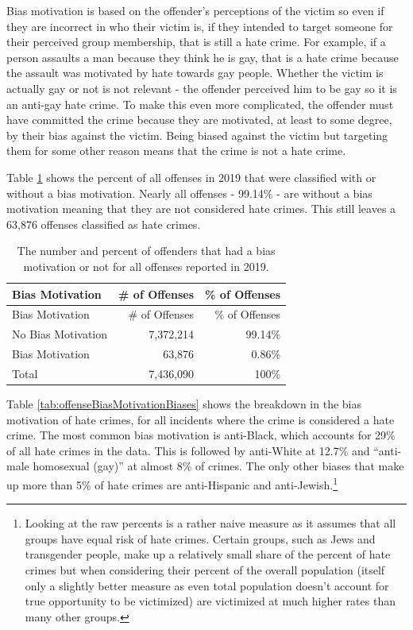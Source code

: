 \documentclass[
  12pt,
  openany]{book}
\begin{document}
Bias motivation is based on the offender's perceptions of the victim so even if they are incorrect in who their victim is, if they intended to target someone for their perceived group membership, that is still a hate crime. For example, if a person assaults a man because they think he is gay, that is a hate crime because the assault was motivated by hate towards gay people. Whether the victim is actually gay or not is not relevant - the offender perceived him to be gay so it is an anti-gay hate crime. To make this even more complicated, the offender must have committed the crime because they are motivated, at least to some degree, by their bias against the victim. Being biased against the victim but targeting them for some other reason means that the crime is not a hate crime.

Table \ref{tab:offenseBiasMotivation} shows the percent of all offenses in 2019 that were classified with or without a bias motivation. Nearly all offenses - 99.14\% - are without a bias motivation meaning that they are not considered hate crimes. This still leaves a 63,876 offenses classified as hate crimes.

\begin{longtable}[]{@{}lrr@{}}
\caption{\label{tab:offenseBiasMotivation}The number and percent of offenders that had a bias motivation or not for all offenses reported in 2019.}\tabularnewline
\toprule
Bias Motivation & \# of Offenses & \% of Offenses\tabularnewline
\midrule
\endfirsthead
\toprule
Bias Motivation & \# of Offenses & \% of Offenses\tabularnewline
\midrule
\endhead
No Bias Motivation & 7,372,214 & 99.14\%\tabularnewline
Bias Motivation & 63,876 & 0.86\%\tabularnewline
Total & 7,436,090 & 100\%\tabularnewline
\bottomrule
\end{longtable}

Table \ref{tab:offenseBiasMotivationBiases} shows the breakdown in the bias motivation of hate crimes, for all incidents where the crime is considered a hate crime. The most common bias motivation is anti-Black, which accounts for 29\% of all hate crimes in the data. This is followed by anti-White at 12.7\% and ``anti-male homosexual (gay)'' at almost 8\% of crimes. The only other biases that make up more than 5\% of hate crimes are anti-Hispanic and anti-Jewish.\footnote{Looking at the raw percents is a rather naive measure as it assumes that all groups have equal risk of hate crimes. Certain groups, such as Jews and transgender people, make up a relatively small share of the percent of hate crimes but when considering their percent of the overall population (itself only a slightly better measure as even total population doesn't account for true opportunity to be victimized) are victimized at much higher rates than many other groups.}
\end{document}
